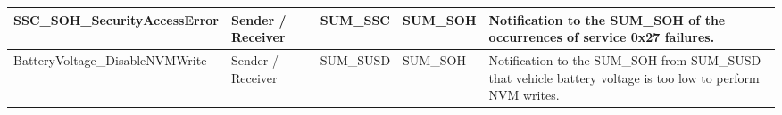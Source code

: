 \begin{longtable}{|l|l|l|l|l|}
\begin{minipage}{0.42\linewidth}\raggedright\vspace{.75ex}SSC\_SOH\_SecurityAccessError\vspace{.75ex}\end{minipage} & \begin{minipage}{0.07\linewidth}\raggedright\vspace{.75ex}Sender / Receiver\vspace{.75ex}\end{minipage} & \begin{minipage}{0.10\linewidth}\raggedright\vspace{.75ex}SUM\_SSC\vspace{.75ex}\end{minipage} & \begin{minipage}{0.10\linewidth}\raggedright\vspace{.75ex}SUM\_SOH\vspace{.75ex}\end{minipage} & \begin{minipage}{0.17\linewidth}\raggedright\vspace{.75ex}Notification to the SUM\_SOH of the occurrences of service 0x27 failures.\vspace{.75ex}\end{minipage}\\\hline
\begin{minipage}{0.42\linewidth}\raggedright\vspace{.75ex}BatteryVoltage\_DisableNVMWrite\vspace{.75ex}\end{minipage} & \begin{minipage}{0.07\linewidth}\raggedright\vspace{.75ex}Sender / Receiver\vspace{.75ex}\end{minipage} & \begin{minipage}{0.10\linewidth}\raggedright\vspace{.75ex}SUM\_SUSD\vspace{.75ex}\end{minipage} & \begin{minipage}{0.10\linewidth}\raggedright\vspace{.75ex}SUM\_SOH\vspace{.75ex}\end{minipage} & \begin{minipage}{0.17\linewidth}\raggedright\vspace{.75ex}Notification to the SUM\_SOH from SUM\_SUSD that vehicle battery voltage is too low to perform NVM writes.\vspace{.75ex}\end{minipage}\\\hline

\end{longtable}
